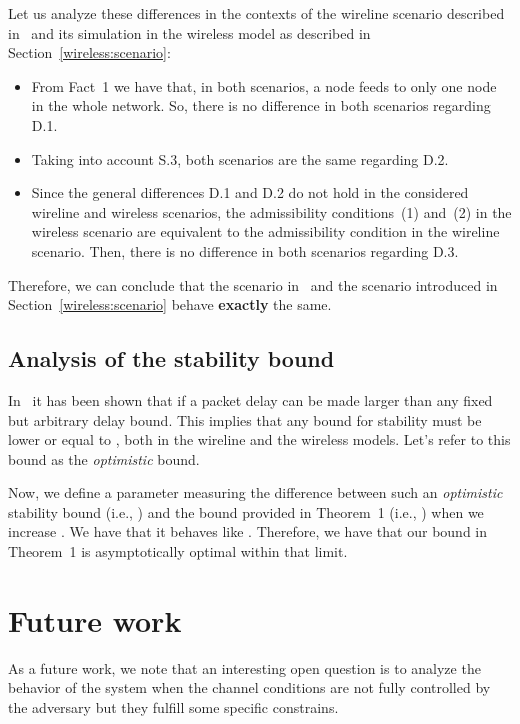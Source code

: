 \documentclass[journal,twocolumn]{./IEEEtran}
\begin{document}
Let us analyze these differences in the contexts of the wireline scenario described in~\cite{DBLP:journals/ton/BennettBCCB02} and its simulation in the wireless model as described in Section~\ref{wireless:scenario}:
\begin{itemize}
\item
From Fact~1 we have that, in both scenarios, a node feeds to only one node in the whole network. So, there is no difference in both scenarios regarding D.1.
\item
Taking into account S.3, both scenarios are the same regarding D.2.
\item
Since the general differences D.1 and D.2 do not hold in the considered wireline and wireless scenarios, the admissibility conditions~(1) and~(2) in the wireless scenario are equivalent to the admissibility condition in the wireline scenario. Then,  there is no difference in both scenarios regarding D.3.
\end{itemize}


Therefore, we can conclude that the scenario in~\cite{DBLP:journals/ton/BennettBCCB02}  and the scenario introduced in Section~\ref{wireless:scenario} behave {\bf exactly} the same.


\subsection{Analysis of the stability bound}

In~\cite{DBLP:journals/ton/BennettBCCB02} it has been shown that if  a packet delay can be made larger than any fixed but arbitrary delay bound. This implies that any bound for stability must be lower or equal to  , both in the wireline and the wireless models.  Let's refer to this bound as the \emph{optimistic} bound.







Now, we define a parameter  measuring the difference between such an \emph{optimistic} stability bound (i.e., ) and the bound provided in Theorem~1 (i.e., ) when we increase . We have that it behaves like . Therefore, we have that our bound in Theorem~1 is asymptotically optimal within that limit.













\section{Future work}
As a future work, we note that an interesting open question is to analyze the behavior of the system when the channel conditions are not fully controlled by the adversary but they fulfill some specific constrains.


\end{document}

